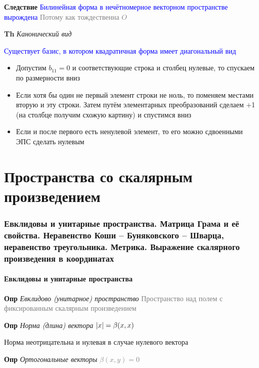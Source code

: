 \documentclass[a4paper, 14pt]{article}
\begin{document}
    \textbf{Следствие} \textcolor{blue}{Билинейная форма в нечётномерное векторном пространстве вырождена}
    \textcolor{gray}{Потому как тождественна $O$}
    
    \textbf{Th} \textit{Канонический вид}
    
    \textcolor{blue}{Существует базис, в котором квадратичная форма имеет диагональный вид}
    
    \begin{itemize}
        \item Допустим $b_{11} = 0$ и соответствующие строка и столбец нулевые, то спускаем по размерности вниз
        \item Если хотя бы один не первый элемент строки не ноль, то поменяем местами вторую и эту строки.
        Затем путём элементарных преобразований сделаем +1 (на столбце получим схожую картину) и спустимся вниз
        \item Если и после первого есть ненулевой элемент, то его можно сдвоенными ЭПС сделать нулевым
    \end{itemize}
    
     \part*{Пространства со скалярным произведением}
    
    \section{Евклидовы и унитарные пространства.
    Матрица Грама и её свойства.
    Неравенство Коши -- Буняковского -- Шварца, неравенство треугольника.
    Метрика.
    Выражение скалярного произведения в координатах}
    
    \subsection{Евклидовы и унитарные пространства}
    
    \textbf{Опр} \textit{Евклидово (унитарное) пространство} \textcolor{gray}{Пространство над полем с фиксированным
    скалярным произведением}
    
    \textbf{Опр} \textit{Норма (длина) вектора} \textcolor{gray}{$\abs{x} =  \beta (x, x)$}
    
    Норма неотрицательна и нулевая в случае нулевого вектора
    
    \textbf{Опр} \textit{Ортогональные векторы} \textcolor{gray}{$\beta (x, y) = 0$}
    
\end{document}
